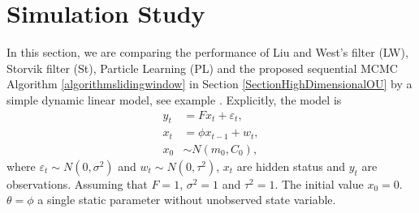 \section{Simulation Study}\label{sectionFilterreviewSimulation}



In this section, we are comparing the performance of Liu and West's filter (LW), Storvik filter (St), Particle Learning (PL) and the proposed sequential MCMC Algorithm \ref{algorithmslidingwindow} in Section \ref{SectionHighDimensionalOU} by a simple dynamic linear model, see example \citep{liu2001combined}. Explicitly, the model is 
\begin{align*}
y_t&=F x_t+\varepsilon_t,\\
x_t&=\phi x_{t-1}+w_t,\\
x_0&\sim N(m_0,C_0),
\end{align*}
where $\varepsilon_t\sim N\left(0,\sigma^2\right)$ and $w_t\sim N\left(0,\tau^2\right)$, $x_t$ are hidden status and $y_t$ are observations. Assuming that $F=1$, $\sigma^2=1$ and $\tau^2=1$. The initial value $x_0=0$. $\theta = \phi$ a single static parameter without unobserved state variable. 

